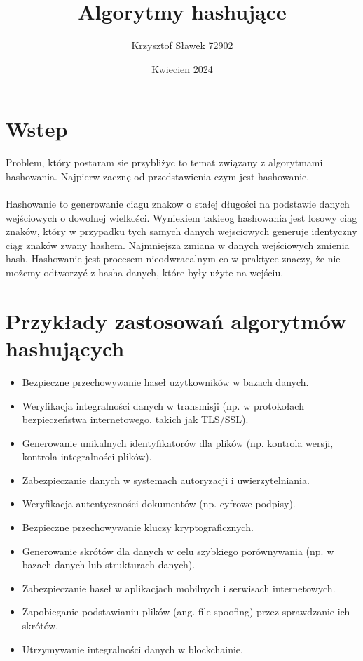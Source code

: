 \documentclass{article}
\title{Algorytmy hashujące}
\author{Krzysztof Sławek 72902}
\date{Kwiecien 2024}
\begin{document}
\maketitle

\section{Wstep}

Problem, który postaram sie przybliżyc to temat związany z algorytmami hashowania.
Najpierw zacznę od przedstawienia czym jest hashowanie.
\\
\\
Hashowanie to generowanie ciagu znakow o stałej długości na podstawie danych wejściowych o dowolnej wielkości. Wyniekiem takieog hashowania jest losowy ciag znaków, który w przypadku tych samych danych wejsciowych generuje identyczny ciąg znaków zwany hashem. Najmniejsza zmiana w danych wejściowych zmienia hash. 
Hashowanie jest procesem nieodwracalnym co w praktyce znaczy, że nie możemy odtworzyć z hasha danych, które były użyte na wejściu.

\section{Przykłady zastosowań algorytmów hashujących}

\begin{itemize}
    \item Bezpieczne przechowywanie haseł użytkowników w bazach danych.
    \item Weryfikacja integralności danych w transmisji 
    (np. w protokołach bezpieczeństwa internetowego, takich jak TLS/SSL).
    \item Generowanie unikalnych identyfikatorów dla plików (np. kontrola wersji, kontrola integralności plików).
    \item Zabezpieczanie danych w systemach autoryzacji i uwierzytelniania.
    \item Weryfikacja autentyczności dokumentów (np. cyfrowe podpisy).
    \item Bezpieczne przechowywanie kluczy kryptograficznych.
    \item Generowanie skrótów dla danych w celu szybkiego porównywania (np. w bazach danych lub strukturach danych).
    \item Zabezpieczanie haseł w aplikacjach mobilnych i serwisach internetowych.
    \item Zapobieganie podstawianiu plików (ang. file spoofing) przez sprawdzanie ich skrótów.
    \item Utrzymywanie integralności danych w blockchainie.
\end{itemize}
\end{document}

